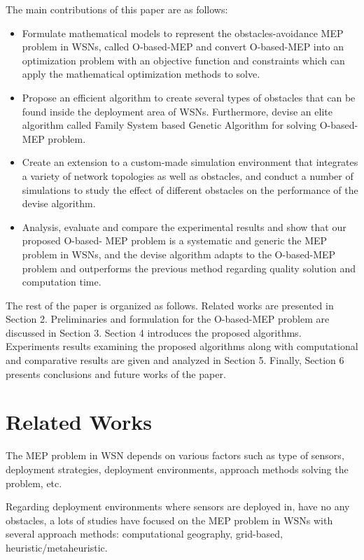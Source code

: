 \documentclass[final]{elsarticle}
\begin{document}
The main contributions of this paper are as follows:
\begin{itemize}
	\itemsep0em
	\item Formulate mathematical models to represent the obstacles-avoidance MEP problem in WSNs, called O-based-MEP and convert O-based-MEP into an optimization problem with an objective function and constraints which can apply the mathematical optimization methods to solve.
	\item Propose an efficient algorithm to create several types of obstacles that can be found inside the deployment area of WSNs. Furthermore, devise an elite algorithm called Family System based Genetic Algorithm for solving O-based-MEP problem. 
	\item Create an extension to a custom-made simulation environment that integrates a variety of network topologies as well as obstacles, and conduct a number of simulations to study the effect of different obstacles on the performance of the devise algorithm. 
	\item Analysis, evaluate and compare the experimental results and show that our proposed O-based- MEP problem is a systematic and generic the MEP problem in WSNs, and the devise algorithm adapts to the O-based-MEP problem and outperforms the previous method regarding quality solution and computation time.	
\end{itemize}
The rest of the paper is organized as follows. Related works are presented in Section 2. Preliminaries and formulation for the O-based-MEP problem are discussed in Section 3. Section 4 introduces the proposed algorithms. Experiments results examining the proposed algorithms along with computational and comparative results are given and analyzed in Section 5. Finally, Section 6 presents conclusions and future works of the paper.
\section{Related Works}
The MEP problem in WSN depends on various factors such as type of sensors, deployment strategies, deployment environments, approach methods solving the problem, etc. 

Regarding deployment environments where sensors are deployed in, have no any obstacles, a lots of studies have focused on the MEP problem in WSNs with several approach methods: computational geography, grid-based, heuristic/metaheuristic.
\end{document}
